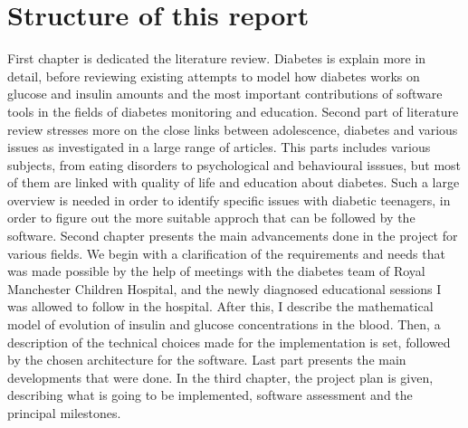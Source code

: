 \documentclass[12pt,MSc]{muthesis}
\begin{document}
\section{Structure of this report}

First chapter is dedicated the literature review. Diabetes is explain more in detail, before reviewing existing attempts to model how diabetes works on glucose and insulin amounts and the most important contributions of software tools in the fields of diabetes monitoring and education. Second part of literature review stresses more on the close links between adolescence, diabetes and various issues as investigated in a large range of articles. This parts includes various subjects, from eating disorders to psychological and behavioural isssues, but most of them are linked with quality of life and education about diabetes. Such a large overview is needed in order to identify specific issues with diabetic teenagers, in order to figure out the more suitable approch that can be followed by the software. 
Second chapter presents the main advancements done in the project for various fields. We begin with a clarification of the requirements and needs that was made possible by the help of meetings with the diabetes team of Royal Manchester Children Hospital, and the newly diagnosed educational sessions I was allowed to follow in the hospital. After this, I describe the mathematical model of evolution of insulin and glucose concentrations in the blood. Then, a description of the technical choices made for the implementation is set, followed by the chosen architecture for the software. Last part presents the main developments that were done.
In the third chapter, the project plan is given, describing what is going to be implemented, software assessment and the principal milestones.
 











\end{document}
